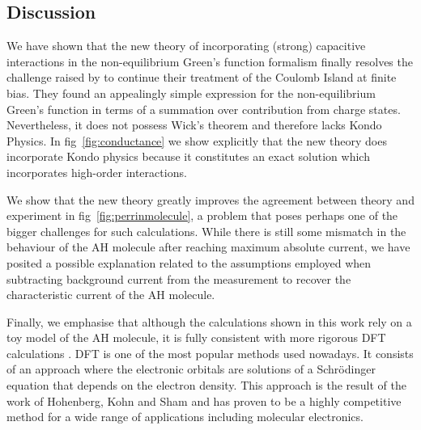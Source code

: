 \documentclass{article}
\begin{document}
\begin{multicols}{2}
    \section{Discussion}\label{sec:discussion}
    We have shown that the new theory of incorporating (strong) capacitive interactions in the non-equilibrium Green's function formalism finally resolves the challenge raised by \citet{haugjauho} to continue their treatment of the Coulomb Island at finite bias. They found an appealingly simple expression for the non-equilibrium Green's function in terms of a summation over contribution from charge states. Nevertheless, it does not possess Wick's theorem and therefore lacks Kondo Physics. In fig~\ref{fig:conductance} we show explicitly that the new theory does incorporate Kondo physics because it constitutes an exact solution which incorporates high-order interactions.
    
    We show that the new theory greatly improves the agreement between theory and experiment in fig~\ref{fig:perrinmolecule}, a problem that poses perhaps one of the bigger challenges for such calculations. While there is still some mismatch in the behaviour of the AH molecule after reaching maximum absolute current, we have posited a possible explanation related to the assumptions employed when subtracting background current from the measurement to recover the characteristic current of the AH molecule. 
    
    
    Finally, we emphasise that although the calculations shown in this work rely on a toy model of the AH molecule, it is fully consistent with more rigorous DFT calculations \cite{perrinnano}. DFT is one of the most popular methods used nowadays. It consists of an approach where the electronic orbitals are solutions of a Schr\"odinger equation that depends on the electron density. This approach is the result of the work of Hohenberg, Kohn and Sham \cite{Hohenberg1964, kohnsham, nobel1998} and has proven to be a highly competitive method for a wide range of applications including molecular electronics.
    

\end{multicols}
\end{document}
